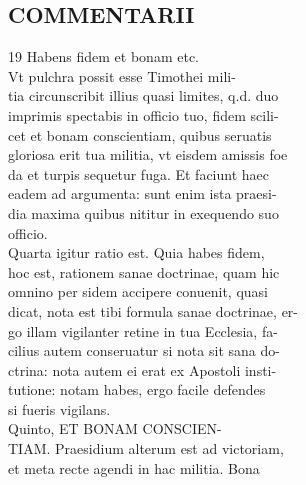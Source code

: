\documentclass{article}
\begin{document}
\begin{pages}
\section*{COMMENTARII \\
                }19 Habens fidem et bonam etc. \\
                Vt pulchra possit esse Timothei mili- \\
                tia circunscribit illius quasi limites, q.d. duo \\
                imprimis spectabis in officio tuo, fidem scili- \\
                cet et bonam conscientiam, quibus seruatis \\
                gloriosa erit tua militia, vt eisdem amissis foe \\
                da et turpis sequetur fuga. Et faciunt haec \\
                eadem ad argumenta: sunt enim ista praesi- \\
                dia maxima quibus nititur in exequendo suo \\
                officio. \\
                Quarta igitur ratio est. Quia habes fidem, \\
                hoc est, rationem sanae doctrinae, quam hic \\
                omnino per sidem accipere conuenit, quasi \\
                dicat, nota est tibi formula sanae doctrinae, er- \\
                go illam vigilanter retine in tua Ecclesia, fa- \\
                cilius autem conseruatur si nota sit sana do- \\
                ctrina: nota autem ei erat ex Apostoli insti- \\
                tutione: notam habes, ergo facile defendes \\
                si fueris vigilans. \\
                Quinto, ET BONAM CONSCIEN- \\
                TIAM. Praesidium alterum est ad victoriam, \\
                et meta recte agendi in hac militia. Bona \\
                

\end{pages}
\end{document}
